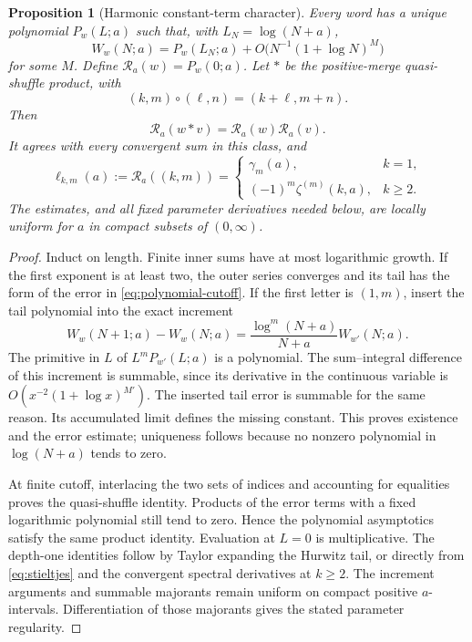 \documentclass[11pt]{article}
\numberwithin{equation}{section}
\newtheorem{proposition}[theorem]{Proposition}
\theoremstyle{definition}
\newcommand{\R}{\mathcal R}
\begin{document}
\begin{proposition}[Harmonic constant-term character]\label{prop:character}
Every word has a unique polynomial $P_w(L;a)$ such that, with
$L_N=\log(N+a)$,
\begin{equation}\label{eq:polynomial-cutoff}
 W_w(N;a)=P_w(L_N;a)+O\bigl(N^{-1}(1+\log N)^M\bigr)
\end{equation}
for some $M$. Define $\R_a(w)=P_w(0;a)$. Let $*$ be the positive-merge
quasi-shuffle product, with
\begin{equation}\label{eq:merge}
 (k,m)\circ(\ell,n)=(k+\ell,m+n).
\end{equation}
Then
\begin{equation}\label{eq:character}
 \R_a(w*v)=\R_a(w)\R_a(v).
\end{equation}
It agrees with every convergent sum in this class, and
\begin{equation}\label{eq:single-letters}
 \ell_{k,m}(a):=\R_a((k,m))=
 \begin{cases}
 \gamma_m(a),&k=1,\\
 (-1)^m\zeta^{(m)}(k,a),&k\ge2.
 \end{cases}
\end{equation}
The estimates, and all fixed parameter derivatives needed below, are
locally uniform for $a$ in compact subsets of $(0,\infty)$.
\end{proposition}
\begin{proof}
Induct on length. Finite inner sums have at most logarithmic growth. If
the first exponent is at least two, the outer series converges and its
tail has the form of the error in \eqref{eq:polynomial-cutoff}. If the
first letter is $(1,m)$, insert the tail polynomial into the exact increment
\[
 W_w(N+1;a)-W_w(N;a)=
       \frac{\log^m(N+a)}{N+a}W_{w'}(N;a).
\]
The primitive in $L$ of $L^mP_{w'}(L;a)$ is a polynomial. The sum--integral
difference of this increment is summable, since its derivative in the
continuous variable is $O(x^{-2}(1+\log x)^{M'})$. The inserted tail error
is summable for the same reason. Its accumulated limit defines the missing
constant. This proves existence and the error estimate; uniqueness follows
because no nonzero polynomial in $\log(N+a)$ tends to zero.

At finite cutoff, interlacing the two sets of indices and accounting for
equalities proves the quasi-shuffle identity. Products of the error terms
with a fixed logarithmic polynomial still tend to zero. Hence the
polynomial asymptotics satisfy the same product identity. Evaluation at
$L=0$ is multiplicative. The depth-one identities follow by Taylor
expanding the Hurwitz tail, or directly from \eqref{eq:stieltjes} and the
convergent spectral derivatives at $k\ge2$. The increment arguments and
summable majorants remain uniform on compact positive $a$-intervals.
Differentiation of those majorants gives the stated parameter regularity.
\end{proof}
\end{document}
